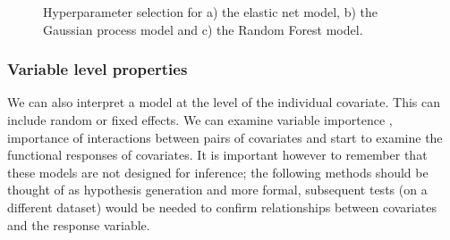 \documentclass[10pt,]{article}
\begin{document}
\begin{figure}[t!]
  \centering

  \label{fig:hyp}
  \caption{
    Hyperparameter selection for a) the elastic net model, b) the Gaussian process model and c) the Random Forest model.
  }
\end{figure}




\subsubsection{Variable level properties}\label{variable-level-properties}

We can also interpret a model at the level of the individual covariate. This can include random or fixed effects. We can examine variable importence \citep{oppel2009alternative}, importance of interactions between pairs of covariates and start to examine the functional responses of covariates. It is important however to remember that these models are not designed for inference; the following methods should be thought of as hypothesis generation and more formal, subsequent tests (on a different dataset) would be needed to confirm relationships between covariates and the response variable.
\end{document}
